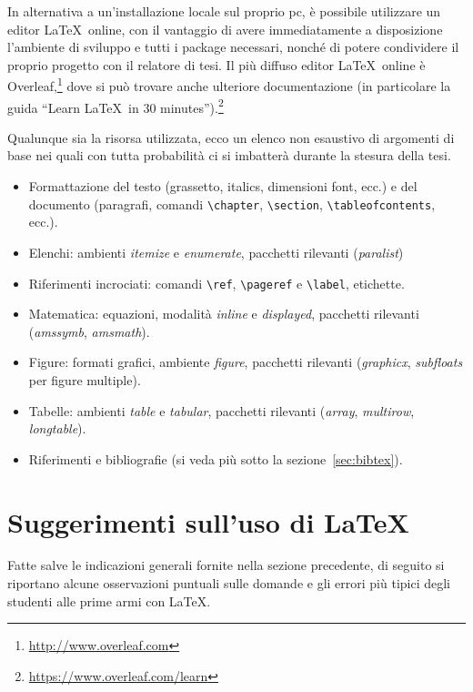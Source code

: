 \documentclass[12pt]{report}
\begin{document}
In alternativa a un'installazione locale sul proprio pc, \`e possibile utilizzare un editor \LaTeX\ online, con il vantaggio di avere immediatamente a disposizione l'ambiente di sviluppo e tutti i package necessari, nonch\'e di potere condividere il proprio progetto con il relatore di tesi. Il pi\`u diffuso editor \LaTeX\ online \`e Overleaf,\footnote{\url{http://www.overleaf.com}} dove si pu\`o trovare anche ulteriore documentazione (in particolare la guida ``Learn \LaTeX\ in 30 minutes'').\footnote{\url{https://www.overleaf.com/learn}}

Qualunque sia la risorsa utilizzata, ecco un elenco non esaustivo di argomenti di base nei quali con tutta probabilit\`a ci si imbatter\`a durante la stesura della tesi.
\begin{itemize}
\item Formattazione del testo (grassetto, italics, dimensioni font, ecc.) e del documento (paragrafi, comandi \verb|\chapter|, \verb|\section|, \verb|\tableofcontents|, ecc.).
\item Elenchi: ambienti {\em itemize} e {\em enumerate}, pacchetti rilevanti ({\em paralist})
\item Riferimenti incrociati: comandi \verb|\ref|, \verb|\pageref| e \verb|\label|, etichette.
\item Matematica: equazioni, modalit\`a {\em inline} e {\em displayed}, pacchetti rilevanti ({\em amssymb}, {\em amsmath}).
\item Figure: formati grafici, ambiente {\em figure}, pacchetti rilevanti ({\em graphicx}, {\em subfloats} per figure multiple).
\item Tabelle: ambienti {\em table} e {\em tabular}, pacchetti rilevanti ({\em array}, {\em multirow}, {\em longtable}).
\item Riferimenti e bibliografie (si veda pi\`u sotto la sezione~\ref{sec:bibtex}).
\end{itemize}

\section{Suggerimenti sull'uso di \LaTeX}
\label{sec:consigli_latex}

Fatte salve le indicazioni generali fornite nella sezione precedente, di seguito si riportano alcune osservazioni puntuali sulle domande e gli errori pi\`u tipici degli studenti alle prime armi con \LaTeX.
\end{document}
